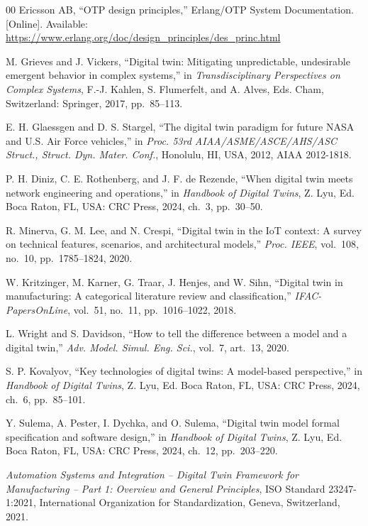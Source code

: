 \documentclass[conference]{IEEEtran}
\begin{document}
\begin{thebibliography}{00}
 Ericsson AB, ``OTP design principles,'' Erlang/OTP System Documentation. [Online]. Available: \url{https://www.erlang.org/doc/design_principles/des_princ.html}

 M. Grieves and J. Vickers, ``Digital twin: Mitigating unpredictable, undesirable emergent behavior in complex systems,'' in \emph{Transdisciplinary Perspectives on Complex Systems}, F.-J. Kahlen, S. Flumerfelt, and A. Alves, Eds. Cham, Switzerland: Springer, 2017, pp.~85--113.

 E. H. Glaessgen and D. S. Stargel, ``The digital twin paradigm for future NASA and U.S. Air Force vehicles,'' in \emph{Proc. 53rd AIAA/ASME/ASCE/AHS/ASC Struct., Struct. Dyn. Mater. Conf.}, Honolulu, HI, USA, 2012, AIAA 2012-1818.

 P. H. Diniz, C. E. Rothenberg, and J. F. de Rezende, ``When digital twin meets network engineering and operations,'' in \emph{Handbook of Digital Twins}, Z. Lyu, Ed. Boca Raton, FL, USA: CRC Press, 2024, ch.~3, pp.~30--50.

 R. Minerva, G. M. Lee, and N. Crespi, ``Digital twin in the IoT context: A survey on technical features, scenarios, and architectural models,'' \emph{Proc. IEEE}, vol.~108, no.~10, pp.~1785--1824, 2020.

 W. Kritzinger, M. Karner, G. Traar, J. Henjes, and W. Sihn, ``Digital twin in manufacturing: A categorical literature review and classification,'' \emph{IFAC-PapersOnLine}, vol.~51, no.~11, pp.~1016--1022, 2018.

 L. Wright and S. Davidson, ``How to tell the difference between a model and a digital twin,'' \emph{Adv. Model. Simul. Eng. Sci.}, vol.~7, art.~13, 2020.

 S. P. Kovalyov, ``Key technologies of digital twins: A model-based perspective,'' in \emph{Handbook of Digital Twins}, Z. Lyu, Ed. Boca Raton, FL, USA: CRC Press, 2024, ch.~6, pp.~85--101.

 Y. Sulema, A. Pester, I. Dychka, and O. Sulema, ``Digital twin model formal specification and software design,'' in \emph{Handbook of Digital Twins}, Z. Lyu, Ed. Boca Raton, FL, USA: CRC Press, 2024, ch.~12, pp.~203--220.

 \emph{Automation Systems and Integration -- Digital Twin Framework for Manufacturing -- Part 1: Overview and General Principles}, ISO Standard 23247-1:2021, International Organization for Standardization, Geneva, Switzerland, 2021.


\end{thebibliography}
\end{document}
